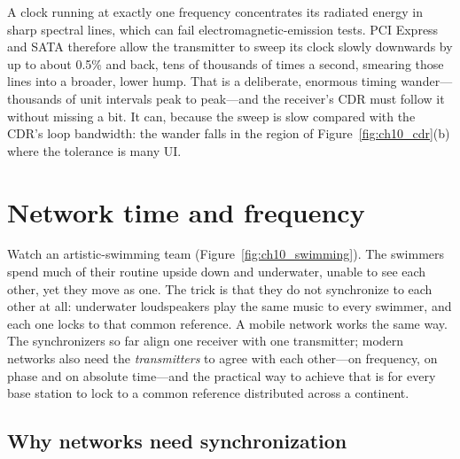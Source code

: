 \begin{inpractice}
A clock running at exactly one frequency concentrates its radiated energy in sharp spectral lines,
which can fail electromagnetic-emission tests. PCI Express and SATA therefore allow the transmitter
to sweep its clock slowly downwards by up to about 0.5\% and back, tens of thousands of times a
second, smearing those lines into a broader, lower hump. That is a deliberate, enormous timing
wander---thousands of unit intervals peak to peak---and the receiver's CDR must follow it without
missing a bit. It can, because the sweep is slow compared with the CDR's loop bandwidth: the wander
falls in the region of Figure~\ref{fig:ch10_cdr}(b) where the tolerance is many UI.
\end{inpractice}

\section{Network time and frequency}
\label{sec:ch10:network}

Watch an artistic-swimming team (Figure~\ref{fig:ch10_swimming}). The swimmers spend much of their
routine upside down and underwater, unable to see each other, yet they move as one. The trick is
that they do not synchronize to each other at all: underwater loudspeakers play the same music to
every swimmer, and each one locks to that common reference. A mobile network works the same way.
The synchronizers so far align one receiver with one transmitter; modern networks also need the
\emph{transmitters} to agree with each other---on frequency, on phase and on absolute time---and the
practical way to achieve that is for every base station to lock to a common reference distributed
across a continent.


\subsection{Why networks need synchronization}

